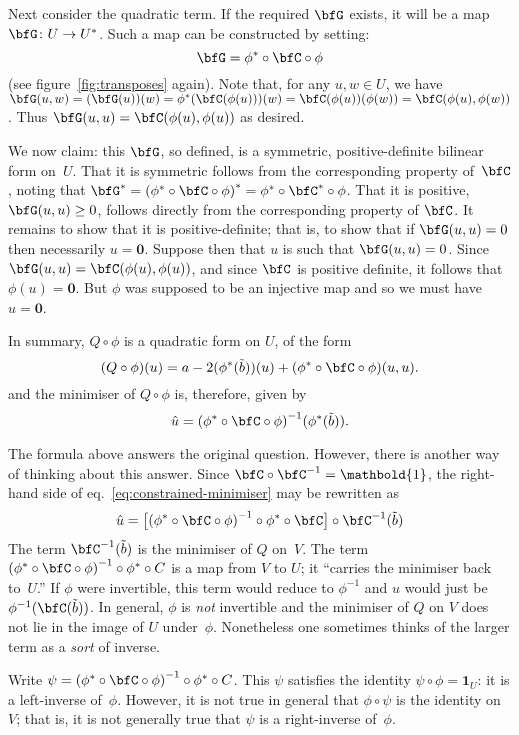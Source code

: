 \documentclass[10pt, a4paper]{article}
\newcommand{\id}{\mathbold{1}}
\newcommand{\bzero}{\mathbold{0}} %
\begin{document}
Next consider the quadratic term. If the required $\bfG$ exists, it
will be a map $\bfG\colon U\to U^*$. Such a map can be constructed by
setting:
\[
  \bfG = \phi^*\circ \bfC \circ \phi
\]
(see figure~\ref{fig:transposes} again). Note that, for any
$u,w\in U$, we have
$\bfG(u,w) = (\bfG(u))(w) = \phi^*(\bfC(\phi(u)))(w) = \bfC(\phi(u))(\phi(w)) =
\bfC(\phi(u), \phi(w))$. Thus $\bfG(u,u)=\bfC(\phi(u), \phi(u))$ as desired.

We now claim: this $\bfG$, so defined, is a symmetric,
positive-definite bilinear form on~$U$. That it is symmetric follows
from the corresponding property of~$\bfC$, noting that
$\bfG^* = {(\phi^*\circ \bfC \circ \phi)}^* = \phi^*\circ \bfC^* \circ \phi$. That it is positive,
$\bfG(u,u)\geq 0$, follows directly from the corresponding property of
$\bfC$. It remains to show that it is positive-definite; that is, to
show that if $\bfG(u,u)=0$ then necessarily $u=\bzero$. Suppose then that
$u$ is such that $\bfG(u,u)=0$. Since
$\bfG(u,u) = \bfC(\phi(u),\phi(u))$, and since $\bfC$ is positive definite,
it follows that $\phi(u)=\bzero$. But $\phi$ was supposed to be an injective map
and so we must have $u=\bzero$.

In summary, $Q\circ\phi$ is a quadratic form on $U$, of the form
\[
(Q\circ\phi)(u) = a - 2(\phi^*(\tilde{b}))(u) + (\phi^*\circ\bfC\circ\phi)(u, u).
\]
and the minimiser of $Q\circ\phi$ is, therefore, given by
\begin{equation}
\hat{u} = {(\phi^*\circ\bfC\circ\phi)}^{-1}(\phi^*(\tilde{b})).
\label{eq:constrained-minimiser}
\end{equation}

The formula above answers the original question. However, there is
another way of thinking about this answer. Since
$\bfC\circ \bfC^{-1} = \id$, the right-hand side of
eq.~\eqref{eq:constrained-minimiser} may be rewritten as
\[
  \hat{u} = \bigl[{(\phi^*\circ\bfC\circ\phi)}^{-1}\circ\phi^*\circ \bfC\bigr]\circ
  \bfC^{-1}(\tilde{b})
\]
The term $\bfC^{-1}(\tilde{b})$ is the minimiser of $Q$ on~$V$. The
term ${(\phi^*\circ\bfC\circ\phi)}^{-1}\circ\phi^*\circ C$ is a map from
$V$ to $U$; it ``carries the minimiser back to~$U$.'' If $\phi$ were
invertible, this term would reduce to $\phi^{-1}$ and $\hat{u}$ would
just be $\phi^{-1}(\bfC(\tilde{b}))$.  In general, $\phi$ is \emph{not}
invertible and the minimiser of $Q$ on $V$ does not lie in the image
of $U$ under~$\phi$. Nonetheless one sometimes thinks of the larger term
as a \emph{sort} of inverse. 

Write $\psi={(\phi^*\circ\bfC\circ\phi)}^{-1}\circ\phi^*\circ C$. This
$\psi$ satisfies the identity $\psi\circ\phi=\id_U$: it is a left-inverse
of~$\phi$. However, it is not true in general that $\phi\circ\psi$ is the identity
on~$V$; that is, it is not generally true that $\psi$ is a right-inverse
of~$\phi$.
\end{document}
